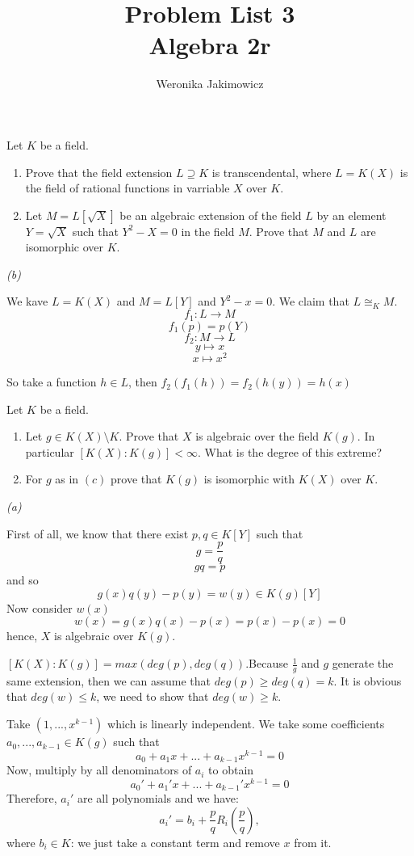 \documentclass{article}
\title{Problem List 3\smallskip\\{\normalsize Algebra 2r}}
\author{Weronika Jakimowicz}
\date{}
\begin{document}
\maketitle
\thispagestyle{empty}

\begin{problem}[1]{}
Let $K$ be a field.
\begin{enumerate}[label=(\alph*)]
    \item Prove that the field extension $L\supseteq K$ is transcendental, where $L=K(X)$ is the field of rational functions in varriable $X$ over $K$.
    \item Let $M=L[\sqrt{X}]$ be an algebraic extension of the field $L$ by an element $Y=\sqrt{X}$ such that $Y^2-X=0$ in the field $M$. Prove that $M$ and $L$ are isomorphic over $K$.
\end{enumerate}
\end{problem}

\emph{(b)}

We kave $L=K(X)$ and $M=L[Y]$ and $Y^2-x=0$. We claim that $L\cong_KM$.
$$f_1:L\to M$$
$$f_1(p)=p(Y)$$
$$f_2:M\to L$$
$$y\mapsto x$$
$$x\mapsto x^2$$

So take a function $h\in L$, then $f_2(f_1(h))=f_2(h(y))=h(x)$

\begin{problem}[2]{}
Let $K$ be a field.
\begin{enumerate}[label=(\alph*)]
    \item Let $g\in K(X)\setminus K$. Prove that $X$ is algebraic over the field $K(g)$. In particular $[K(X):K(g)]<\infty$. What is the degree of this extreme?
    \item For $g$ as in $(c)$ prove that $K(g)$ is isomorphic with $K(X)$ over $K$.
\end{enumerate}
\end{problem}

\emph{(a)}

First of all, we know that there exist $p,q\in K[Y]$ such that
$$g=\frac{p}{q}$$
$$gq=p$$
and so
$$g(x)q(y)-p(y)=w(y)\in K(g)[Y]$$
Now consider $w(x)$
$$w(x)=g(x)q(x)-p(x)=p(x)-p(x)=0$$
hence, $X$ is algebraic over $K(g)$.

$[K(X):K(g)]=max(deg(p),deg(q))$.Because $\frac{1}{g}$ and $g$ generate the same extension, then we can assume that $deg(p)\geq deg(q)=k$. It is obvious that $deg(w)\leq k$, we need to show that $deg(w)\geq k$.

Take $(1,...,x^{k-1})$ which is linearly independent. We take some coefficients $a_0,...,a_{k-1}\in K(g)$  such that
$$a_0+a_1x+...+a_{k-1}x^{k-1}=0$$
Now, multiply by all denominators of $a_i$ to obtain
$$a_0'+a_1'x+...+a_{k-1}'x^{k-1}=0$$
Therefore, $a_i'$ are all polynomials and we have:
$$a_i'=b_i+\frac{p}{q}R_i(\frac{p}{q}),$$
where $b_i\in K$: we just take a constant term and remove $x$ from it.
\end{document}
